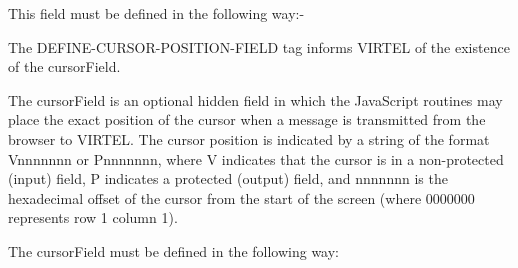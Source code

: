 \documentclass[letterpaper,10pt,english]{sphinxmanual}
\begin{document}
This field must be defined in the following way:-

\begin{sphinxVerbatim}[commandchars=\\\{\}]
   
\end{sphinxVerbatim}


The DEFINE-CURSOR-POSITION-FIELD tag informs VIRTEL of the existence of the cursorField.

\begin{sphinxVerbatim}[commandchars=\\\{\}]
   
\end{sphinxVerbatim}

The cursorField is an optional hidden field in which the JavaScript routines may place the exact position of the cursor
when a message is transmitted from the browser to VIRTEL. The cursor position is indicated by a string of the format
Vnnnnnnn or Pnnnnnnn, where V indicates that the cursor is in a non-protected (input) field, P indicates a protected
(output) field, and nnnnnnn is the hexadecimal offset of the cursor from the start of the screen (where 0000000
represents row 1 column 1).

The cursorField must be defined in the following way:

\begin{sphinxVerbatim}[commandchars=\\\{\}]
   
\end{sphinxVerbatim}
\end{document}
